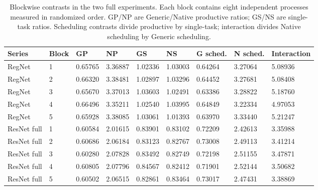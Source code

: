 \begin{table}[t]
\centering
\caption{Blockwise contrasts in the two full experiments. Each block contains eight independent processes measured in randomized order. GP/NP are Generic/Native productive ratios; GS/NS are single-task ratios. Scheduling contrasts divide productive by single-task; interaction divides Native scheduling by Generic scheduling.}
\label{tab:supp-scheduling-blocks}
\begingroup\small\setlength{\tabcolsep}{3pt}
\begin{tabular}{lllllllll}
\toprule
Series & Block & GP & NP & GS & NS & G sched. & N sched. & Interaction \\
\midrule
RegNet & 1 & 0.65765 & 3.36887 & 1.02336 & 1.03003 & 0.64264 & 3.27064 & 5.08936 \\
RegNet & 2 & 0.66320 & 3.38481 & 1.02897 & 1.03296 & 0.64452 & 3.27681 & 5.08408 \\
RegNet & 3 & 0.65670 & 3.37013 & 1.03603 & 1.02491 & 0.63386 & 3.28822 & 5.18760 \\
RegNet & 4 & 0.66496 & 3.35211 & 1.02540 & 1.03995 & 0.64849 & 3.22334 & 4.97053 \\
RegNet & 5 & 0.65928 & 3.38085 & 1.03061 & 1.01393 & 0.63970 & 3.33440 & 5.21247 \\
ResNet full & 1 & 0.60584 & 2.01615 & 0.83901 & 0.83102 & 0.72209 & 2.42613 & 3.35988 \\
ResNet full & 2 & 0.60686 & 2.06184 & 0.83123 & 0.82767 & 0.73008 & 2.49113 & 3.41214 \\
ResNet full & 3 & 0.60280 & 2.07828 & 0.83492 & 0.82749 & 0.72198 & 2.51155 & 3.47871 \\
ResNet full & 4 & 0.60805 & 2.07796 & 0.84567 & 0.82412 & 0.71901 & 2.52144 & 3.50682 \\
ResNet full & 5 & 0.60502 & 2.06515 & 0.82861 & 0.83464 & 0.73017 & 2.47431 & 3.38869 \\
\bottomrule
\end{tabular}
\endgroup
\end{table}
